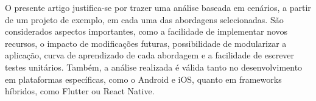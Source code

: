 O presente artigo justifica-se por trazer uma análise baseada em cenários, a partir de um projeto de exemplo, em cada uma das abordagens selecionadas.
São considerados aspectos importantes, como a facilidade de implementar novos recursos, o impacto de modificações futuras, possibilidade de modularizar a aplicação, curva de aprendizado de cada abordagem e a facilidade de escrever testes unitários.
Também, a análise realizada é válida tanto no desenvolvimento em plataformas específicas, como o Android e iOS, quanto em frameworks híbridos, como Flutter ou React Native.